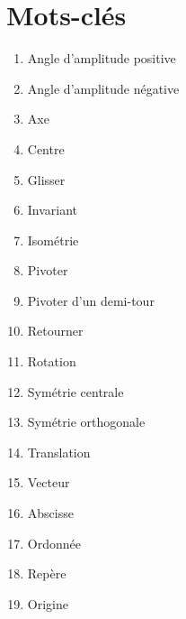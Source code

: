 \documentclass[../../syllabus_1.tex]{subfiles}
\begin{document}
\newpage
\section*{Mots-clés}
\begin{enumerate}[cols=2, label=\textbf{\arabic*.}]
    \item Angle d’amplitude positive
    \item Angle d’amplitude négative
    \item Axe
    \item Centre
    \item Glisser
    \item Invariant
    \item Isométrie
    \item Pivoter
    \item Pivoter d’un demi-tour
    \item Retourner
    \item Rotation
    \item Symétrie centrale
    \item Symétrie orthogonale
    \item Translation
    \item Vecteur
    \item Abscisse
    \item Ordonnée
    \item Repère
    \item Origine
\end{enumerate}
\end{document}
